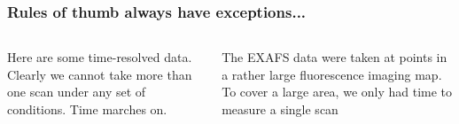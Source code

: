\documentclass[10pt, xcolor=x11names, compress]{beamer}
\begin{document}
\begin{frame}
  \frametitle{Rules of thumb always have exceptions...}
  \small
  \begin{columns}[T]
    \begin{column}{0.5\linewidth}
      Here are some time-resolved data.  Clearly we cannot take more
      than one scan under any set of conditions. Time marches on.        
    \end{column}
    \begin{column}{0.5\linewidth}
      The EXAFS data were taken at points in a rather large
      fluorescence imaging map.  To cover a large area, we only had time
      to measure a single scan
    \end{column}
  \end{columns}

  \medskip


\end{frame}
\end{document}
